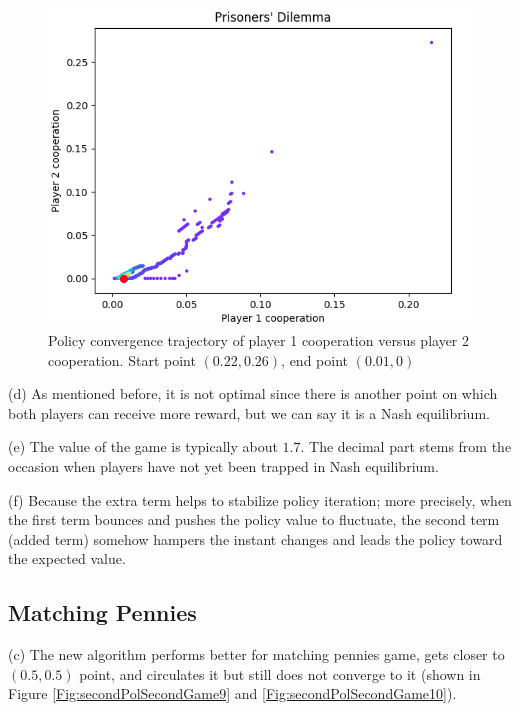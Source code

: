 \documentclass[journal]{IEEEtran}
\begin{document}
\begin{figure}[!t]

\centering
\includegraphics[scale=0.37]{figure/firstGameSecondPolicy4m.png}
\caption{Policy convergence trajectory of player 1 cooperation versus player 2 cooperation. Start point $(0.22, 0.26)$, end point $(0.01, 0)$}
\label{Fig:secondPolFirstGame8}
\end{figure}
(d) As mentioned before, it is not optimal since there is another point on which both players can receive more reward, but we can say it is a Nash equilibrium. 

(e) The value of the game is typically about $1.7$. The decimal part stems from the occasion when players have not yet been trapped in Nash equilibrium.

(f) Because the extra term helps to stabilize policy iteration; more precisely, when the first term bounces and pushes the policy value to fluctuate, the second term (added term) somehow hampers the instant changes and leads the policy toward the expected value.
\subsection{Matching Pennies}

(c) The new algorithm performs better for matching pennies game, gets closer to $(0.5, 0.5)$ point, and circulates it but still does not converge to it \cite{the} (shown in Figure \ref{Fig:secondPolSecondGame9} and \ref{Fig:secondPolSecondGame10}).
\end{document}
